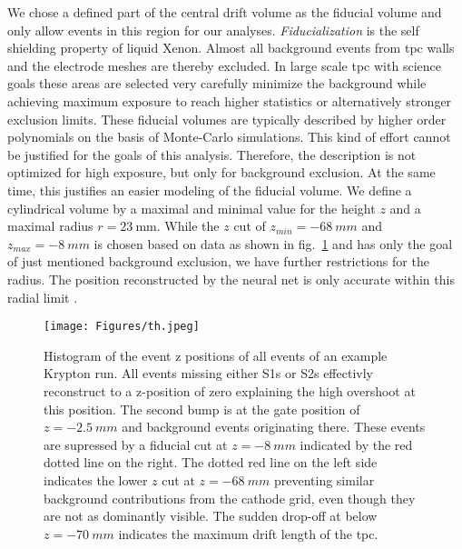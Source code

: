 We chose a defined part of the central drift volume as the fiducial volume and only allow events in this region for our analyses.
\emph{Fiducialization} is the self shielding property of liquid Xenon.
Almost all background events from \gls{tpc} walls and the electrode meshes are thereby excluded.
In large scale \gls{tpc} with science goals these areas are selected very carefully minimize the background while achieving maximum exposure to reach higher statistics or alternatively stronger exclusion limits.
These fiducial volumes are typically described by higher order polynomials on the basis of Monte-Carlo simulations.
This kind of effort cannot be justified for the goals of this analysis.
Therefore, the description is not optimized for high exposure, but only for background exclusion.
At the same time, this justifies an easier modeling of the fiducial volume.
We define a cylindrical volume by a maximal and minimal value for the height $z$ and a maximal radius $r = \SI{23}{\milli\m}$.
While the $z$ cut of $z_{min}= \SI{-68}{mm}$ and $z_{max}= \SI{-8}{mm}$ is chosen based on data as shown in fig.~\ref{fig:fid-z-cut}  and has only the goal of just mentioned background exclusion, we have further restrictions for the radius.
The position reconstructed by the neural net is only accurate within this radial limit \cite{ABism}.


\begin{figure}
\centering
\texttt{[image: Figures/th.jpeg]}  %
    \caption[Fiducial z-cut]{Histogram of the event z positions of all events of an example Krypton run.
                             All events missing either S1s or S2s effectivly reconstruct to a z-position of zero explaining the high overshoot at this position.
                             The second bump is at the gate position of $ z = \SI{-2.5}{mm}$ and background events originating there.
                             These events are supressed by a fiducial cut at $ z = \SI{-8}{mm}$ indicated by the red dotted line on the right.
                             The dotted red line on the left side indicates the lower $z$ cut at $ z = \SI{-68}{mm}$ preventing similar background contributions from the cathode grid,
                             even though they are not as dominantly visible.
                             The sudden drop-off at below $ z = \SI{-70}{mm}$ indicates the maximum drift length of the \gls{tpc}.
                             }
\label{fig:fid-z-cut}
\end{figure}


